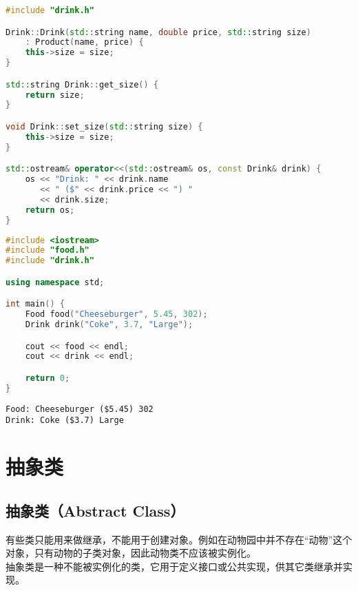 \begin{lstlisting}[language=C++]
#include "drink.h"

Drink::Drink(std::string name, double price, std::string size)
    : Product(name, price) {
    this->size = size;
}

std::string Drink::get_size() {
    return size;
}

void Drink::set_size(std::string size) {
    this->size = size;
}

std::ostream& operator<<(std::ostream& os, const Drink& drink) {
    os << "Drink: " << drink.name
       << " ($" << drink.price << ") " 
       << drink.size;
    return os;
}
\end{lstlisting}

\begin{lstlisting}[language=C++]
#include <iostream>
#include "food.h"
#include "drink.h"

using namespace std;

int main() {
    Food food("Cheeseburger", 5.45, 302);
    Drink drink("Coke", 3.7, "Large");

    cout << food << endl;
    cout << drink << endl;

    return 0;
}
\end{lstlisting}

\begin{tcolorbox}
    \begin{verbatim}
Food: Cheeseburger ($5.45) 302
Drink: Coke ($3.7) Large
	\end{verbatim}
\end{tcolorbox}

\newpage

\section{抽象类}

\subsection{抽象类（Abstract Class）}

有些类只能用来做继承，不能用于创建对象。例如在动物园中并不存在“动物”这个对象，只有动物的子类对象，因此动物类不应该被实例化。\\

抽象类是一种不能被实例化的类，它用于定义接口或公共实现，供其它类继承并实现。

\vspace{-0.5cm}

